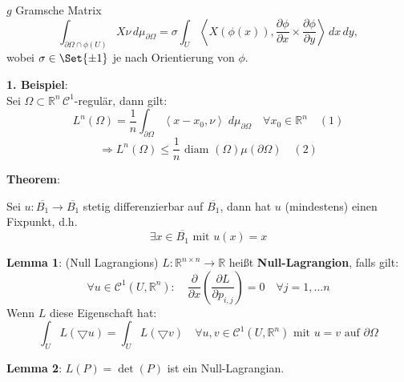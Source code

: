 \documentclass[11pt]{memoir}
\newcommand{\dom}{\partial\Omega}
\begin{document}
\par\bigskip

$g$ Gramsche Matrix
$$\int_{\partial \Omega \cap \phi(U)} X \nu \, d\mu_{\partial\Omega} = \sigma \int_U \left\langle X(\phi(x)), \dfrac{\partial \phi}{\partial x} \times \dfrac{\partial \phi}{\partial y}\right\rangle \, dx \, dy,$$
wobei $\sigma \in \Set{\pm 1}$ je nach Orientierung von $\phi$.

\par\bigskip
\textbf{1. Beispiel}: \\
Sei $\Omega \subset \mathbb R^n \, \mathscr C^1$-regulär, dann gilt:
$$L^n(\Omega) = \dfrac{1}{n} \int_{\partial \Omega} \left\langle x - x_0, \nu\right\rangle \; d\mu_{\partial\Omega} \quad \forall x_0 \in \mathbb R^n \quad (1)$$
$$\Rightarrow L^n(\Omega) \leq \dfrac{1}{n}\text{ diam }(\Omega) \mu(\partial\Omega) \quad (2)$$

\par\bigskip
\textbf{Theorem}: 
\par
Sei $u: \overline{B_1} \rightarrow \overline{B_1}$ stetig differenzierbar auf $\overline{B_1}$, dann hat $u$ (mindestens) einen Fixpunkt, d.h.
$$\exists x \in \overline{B_1} \text{ mit }u(x) = x$$
\par\bigskip

\textbf{Lemma 1}: (Null Lagrangions) 
$L: \mathbb R^{n \times n} \rightarrow \mathbb R$ heißt \textbf{Null-Lagrangion}, falls gilt:
$$\forall u \in \mathscr C^1(U, \mathbb R^n): \quad \dfrac{\partial}{\partial x} \left( \dfrac{\partial L}{\partial p_{i,j}}\right) = 0 \quad \forall j = 1,... n$$
Wenn $L$ diese Eigenschaft hat:
$$\int_U L(\bigtriangledown u) = \int_U L(\bigtriangledown v) \quad \forall u, v \in \mathscr C^1(U, \mathbb R^n) \text{ mit }u = v \text{ auf } \dom$$


\textbf{Lemma 2}: 
$L(P) = \det (P)$ ist ein Null-Lagrangian.
\end{document}
